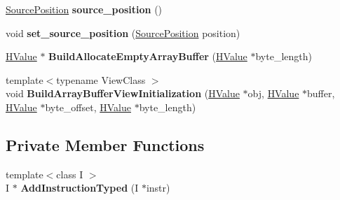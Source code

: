 \begin{DoxyCompactItemize}
\item 
\hyperlink{classv8_1_1internal_1_1_source_position}{Source\+Position} {\bfseries source\+\_\+position} ()\hypertarget{classv8_1_1internal_1_1_h_graph_builder_ae02b9bd0d3ad6917ceaed406f6819997}{}\label{classv8_1_1internal_1_1_h_graph_builder_ae02b9bd0d3ad6917ceaed406f6819997}

\item 
void {\bfseries set\+\_\+source\+\_\+position} (\hyperlink{classv8_1_1internal_1_1_source_position}{Source\+Position} position)\hypertarget{classv8_1_1internal_1_1_h_graph_builder_a9f3b6e8c6ea32b655a300a95977dd713}{}\label{classv8_1_1internal_1_1_h_graph_builder_a9f3b6e8c6ea32b655a300a95977dd713}

\item 
\hyperlink{classv8_1_1internal_1_1_h_value}{H\+Value} $\ast$ {\bfseries Build\+Allocate\+Empty\+Array\+Buffer} (\hyperlink{classv8_1_1internal_1_1_h_value}{H\+Value} $\ast$byte\+\_\+length)\hypertarget{classv8_1_1internal_1_1_h_graph_builder_a80338297eda67f11065974a30ab72bec}{}\label{classv8_1_1internal_1_1_h_graph_builder_a80338297eda67f11065974a30ab72bec}

\item 
{\footnotesize template$<$typename View\+Class $>$ }\\void {\bfseries Build\+Array\+Buffer\+View\+Initialization} (\hyperlink{classv8_1_1internal_1_1_h_value}{H\+Value} $\ast$obj, \hyperlink{classv8_1_1internal_1_1_h_value}{H\+Value} $\ast$buffer, \hyperlink{classv8_1_1internal_1_1_h_value}{H\+Value} $\ast$byte\+\_\+offset, \hyperlink{classv8_1_1internal_1_1_h_value}{H\+Value} $\ast$byte\+\_\+length)\hypertarget{classv8_1_1internal_1_1_h_graph_builder_a58038620b793b5af994a5bd5b601626e}{}\label{classv8_1_1internal_1_1_h_graph_builder_a58038620b793b5af994a5bd5b601626e}

\end{DoxyCompactItemize}
\subsection*{Private Member Functions}
\begin{DoxyCompactItemize}
\item 
{\footnotesize template$<$class I $>$ }\\I $\ast$ {\bfseries Add\+Instruction\+Typed} (I $\ast$instr)\hypertarget{classv8_1_1internal_1_1_h_graph_builder_afb93bc93fba3b48bf581cb96fa4825fd}{}\label{classv8_1_1internal_1_1_h_graph_builder_afb93bc93fba3b48bf581cb96fa4825fd}

\end{DoxyCompactItemize}

